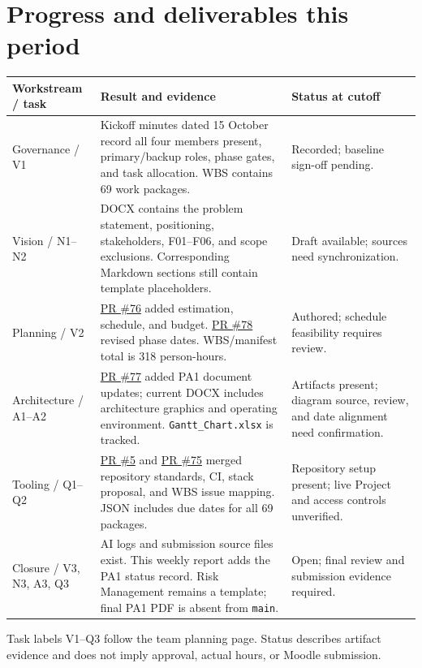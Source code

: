 \documentclass[11pt,a4paper]{article}
\newcommand{\pr}[1]{\href{https://github.com/Vincenthevinh/UniLib/pull/#1}{PR \##1}}
\begin{document}
\section{Progress and deliverables this period}
{\small
\begin{tabularx}{\textwidth}{@{}P{30mm}YP{33mm}@{}}
\toprule
{}\textbf{Workstream / task} & \textbf{Result and evidence} & \textbf{Status at cutoff} \\
\midrule
Governance / V1 & Kickoff minutes dated 15 October record all four members present, primary/backup roles, phase gates, and task allocation. WBS contains 69 work packages. & Recorded; baseline sign-off pending. \\
\addlinespace[3pt]
Vision / N1--N2 & DOCX contains the problem statement, positioning, stakeholders, F01--F06, and scope exclusions. Corresponding Markdown sections still contain template placeholders. & Draft available; sources need synchronization. \\
\addlinespace[3pt]
Planning / V2 & \pr{76} added estimation, schedule, and budget. \pr{78} revised phase dates. WBS/manifest total is 318 person-hours. & Authored; schedule feasibility requires review. \\
\addlinespace[3pt]
Architecture / A1--A2 & \pr{77} added PA1 document updates; current DOCX includes architecture graphics and operating environment. \texttt{Gantt\_Chart.xlsx} is tracked. & Artifacts present; diagram source, review, and date alignment need confirmation. \\
\addlinespace[3pt]
Tooling / Q1--Q2 & \pr{5} and \pr{75} merged repository standards, CI, stack proposal, and WBS issue mapping. JSON includes due dates for all 69 packages. & Repository setup present; live Project and access controls unverified. \\
\addlinespace[3pt]
Closure / V3, N3, A3, Q3 & AI logs and submission source files exist. This weekly report adds the PA1 status record. Risk Management remains a template; final PA1 PDF is absent from \texttt{main}. & Open; final review and submission evidence required. \\
\bottomrule
\end{tabularx}}

\vfill
{\footnotesize Task labels V1--Q3 follow the team planning page. Status describes artifact evidence and does not imply approval, actual hours, or Moodle submission.}

\newpage
\end{document}
